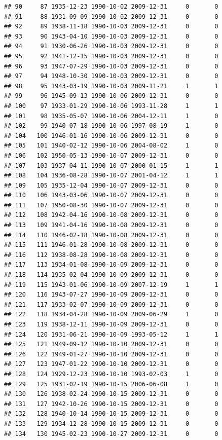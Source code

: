 \documentclass[
]{book}
\begin{document}
\begin{verbatim}
## 90     87 1935-12-23 1990-10-02 2009-12-31     0       0
## 91     88 1931-09-09 1990-10-02 2009-12-31     0       0
## 92     89 1938-11-18 1990-10-03 2009-12-31     0       0
## 93     90 1943-04-10 1990-10-03 2009-12-31     0       0
## 94     91 1930-06-26 1990-10-03 2009-12-31     0       0
## 95     92 1941-12-15 1990-10-03 2009-12-31     0       0
## 96     93 1947-07-29 1990-10-03 2009-12-31     0       0
## 97     94 1948-10-30 1990-10-03 2009-12-31     0       0
## 98     95 1943-03-19 1990-10-03 2009-11-21     1       1
## 99     96 1945-09-13 1990-10-06 2009-12-31     0       0
## 100    97 1933-01-29 1990-10-06 1993-11-28     1       1
## 101    98 1935-05-07 1990-10-06 2004-12-11     1       0
## 102    99 1940-07-18 1990-10-06 1997-08-19     1       0
## 104   100 1946-01-16 1990-10-06 2009-12-31     0       0
## 105   101 1940-02-12 1990-10-06 2004-08-02     1       0
## 106   102 1950-05-13 1990-10-07 2009-12-31     0       0
## 107   103 1937-04-11 1990-10-07 2000-01-15     1       1
## 108   104 1936-08-28 1990-10-07 2001-04-12     1       1
## 109   105 1935-12-04 1990-10-07 2009-12-31     0       0
## 110   106 1943-03-06 1990-10-07 2009-12-31     0       0
## 111   107 1950-08-30 1990-10-07 2009-12-31     0       0
## 112   108 1942-04-16 1990-10-08 2009-12-31     0       0
## 113   109 1941-04-16 1990-10-08 2009-12-31     0       0
## 114   110 1946-02-18 1990-10-08 2009-12-31     0       0
## 115   111 1946-01-28 1990-10-08 2009-12-31     0       0
## 116   112 1938-08-28 1990-10-08 2009-12-31     0       0
## 117   113 1934-01-08 1990-10-09 2009-12-31     0       0
## 118   114 1935-02-04 1990-10-09 2009-12-31     0       0
## 119   115 1943-01-06 1990-10-09 2007-12-19     1       1
## 120   116 1943-07-27 1990-10-09 2009-12-31     0       0
## 121   117 1933-02-07 1990-10-09 2009-12-31     0       0
## 122   118 1934-04-28 1990-10-09 2009-06-29     1       0
## 123   119 1938-12-11 1990-10-09 2009-12-31     0       0
## 124   120 1931-06-21 1990-10-09 1993-05-12     1       1
## 125   121 1949-09-12 1990-10-10 2009-12-31     0       0
## 126   122 1949-01-27 1990-10-10 2009-12-31     0       0
## 127   123 1947-01-22 1990-10-10 2009-12-31     0       0
## 128   124 1929-12-23 1990-10-10 1993-02-03     1       0
## 129   125 1931-02-19 1990-10-15 2006-06-08     1       0
## 130   126 1938-02-24 1990-10-15 2009-12-31     0       0
## 131   127 1942-10-26 1990-10-15 2009-12-31     0       0
## 132   128 1940-10-14 1990-10-15 2009-12-31     0       0
## 133   129 1934-12-28 1990-10-15 2009-12-31     0       0
## 134   130 1945-02-23 1990-10-27 2009-12-31     0       0

\end{verbatim}
\end{document}
